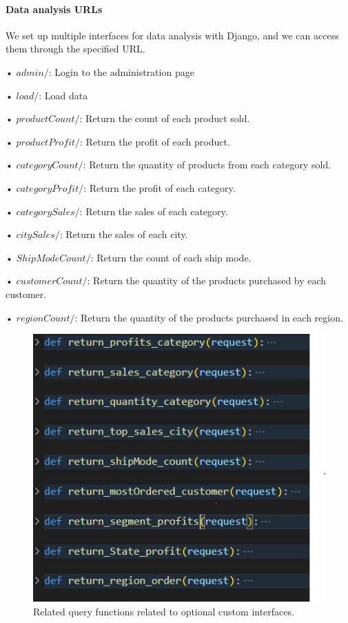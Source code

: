 \paragraph{Data analysis URLs}
We set up multiple interfaces for data analysis with Django, and we can access them through the specified URL.  
\par
• $admin/$: Login to the administration page\par
• $load/$: Load data\par
• $productCount/$: Return the count of each product sold.\par
• $productProfit/$: Return the profit of each product.\par
• $categoryCount/$: Return the quantity of products from each category sold.\par
• $categoryProfit/$: Return the profit of each category.\par
• $categorySales/$: Return the sales of each category.\par
• $citySales/$: Return the sales of each city.\par
• $ShipModeCount/$: Return the count of each ship mode.\par
• $customerCount/$: Return the quantity of the products purchased by each customer.\par
• $regionCount/$: Return the quantity of the products purchased in each region.\par


\begin{figure}[H]
    \centering
    \includegraphics[width=\columnwidth]{images/functions.png}
    \caption[Short text]{Related query functions related to optional custom interfaces.}
    \label{fig:ER}
\end{figure}